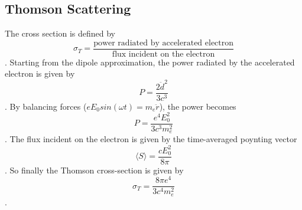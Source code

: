 \subsection{Thomson Scattering}
The cross section is defined by
\begin{dmath*}
\sigma_T = \frac{\text{power radiated by accelerated electron}}{\text{flux incident on the electron}}
\end{dmath*}.
Starting from the dipole approximation, the power radiated by the accelerated electron is given by
\begin{dmath}
P = \frac{2{\ddot d}^2}{3c^3}
\end{dmath}.
By balancing forces ($eE_0sin(\omega t) = m_e\ddot r$), the power becomes
\begin{dmath}
P = \frac{e^4E_0^2}{3c^3m_e^2}
\end{dmath}.
The flux incident on the electron is given by the time-averaged poynting vector
\begin{dmath}
\langle S\rangle = \frac{cE_0^2}{8\pi}
\end{dmath}.
So finally the Thomson cross-section is given by
\begin{dmath}\boxed{
\sigma_T = \frac{8\pi e^4}{3c^4m_e^2}
}\end{dmath}.

